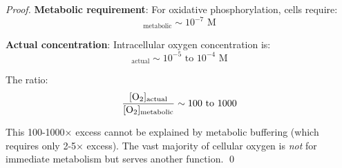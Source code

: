 \begin{proof}
\textbf{Metabolic requirement}: For oxidative phosphorylation, cells require:
\begin{equation}
[\ce{O2}]_{\text{metabolic}} \sim 10^{-7} \text{ M}
\end{equation}

\textbf{Actual concentration}: Intracellular oxygen concentration is:
\begin{equation}
[\ce{O2}]_{\text{actual}} \sim 10^{-5} \text{ to } 10^{-4} \text{ M}
\end{equation}

The ratio:
\begin{equation}
\frac{[\ce{O2}]_{\text{actual}}}{[\ce{O2}]_{\text{metabolic}}} \sim 100 \text{ to } 1000
\end{equation}

This 100-1000× excess cannot be explained by metabolic buffering (which requires only 2-5× excess). The vast majority of cellular oxygen is \textit{not} for immediate metabolism but serves another function. \qed
\end{proof}

